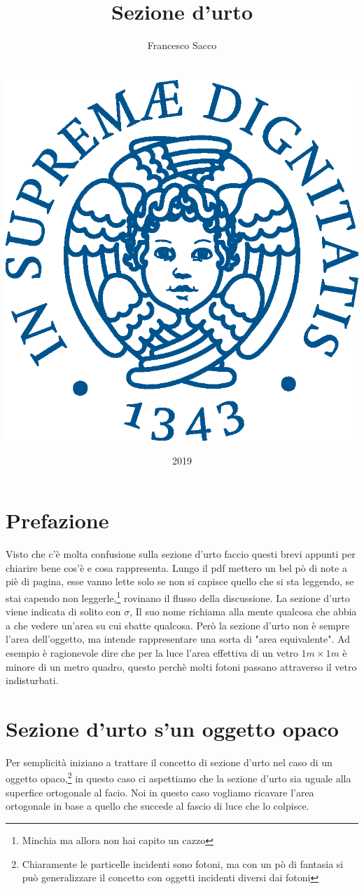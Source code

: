 \documentclass[11pt,a4paper]{article}
\date{{\LARGE 2019}}
\title{{\myfont Sezione d'urto}}
\author{{\Huge Francesco Sacco}\\ \\ \\
		\includegraphics[scale=0.4]{Immagini/cherubino.eps}\\}
\begin{document}
	\maketitle
	\tableofcontents
	\newpage
	\section*{Prefazione}
		Visto che c'è molta confusione sulla sezione d'urto faccio questi brevi appunti per chiarire bene cos'è e cosa rappresenta.\newline
		Lungo il pdf mettero un bel pò di note a piè di pagina, esse vanno lette solo se non si capisce quello che si sta leggendo, se stai capendo non leggerle,\footnote{Minchia ma allora non hai capito un cazzo} rovinano il flusso della discussione.\newline 
		La sezione d'urto viene indicata di solito con $\sigma$, Il suo nome richiama alla mente qualcosa che abbia a che vedere un'area su cui sbatte qualcosa. Però la sezione d'urto non è sempre l'area dell'oggetto, ma intende rappresentare una sorta di "area equivalente".\newline
		Ad esempio è ragionevole dire che per la luce l'area effettiva di un vetro $1m\times 1m$ è minore di un metro quadro, questo perchè molti fotoni passano attraverso il vetro indisturbati.\newline
	\section{Sezione d'urto s'un oggetto opaco}
	\label{sec:opaco}
		Per semplicità iniziano a trattare il concetto di sezione d'urto nel caso di un oggetto opaco,\footnote{Chiaramente le particelle incidenti sono fotoni, ma con un pò di fantasia si può generalizzare il concetto con oggetti incidenti diversi dai fotoni} in questo caso ci aspettiamo che la sezione d'urto sia uguale alla superfice ortogonale al facio.\newline
		Noi in questo caso vogliamo ricavare l'area ortogonale in base a quello che succede al fascio di luce che lo colpisce.\newline
\end{document}
